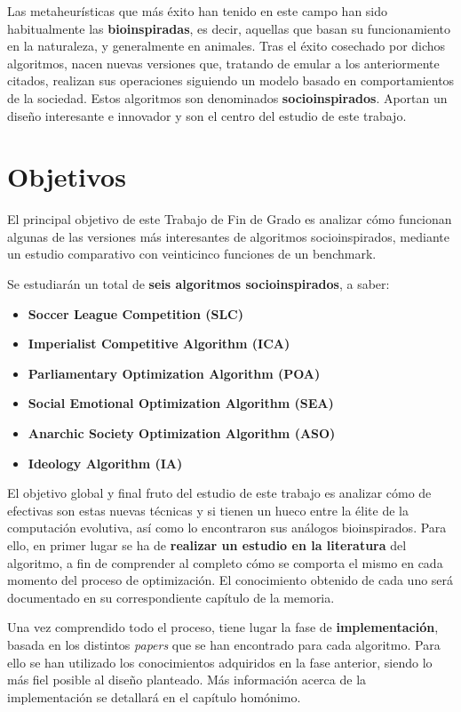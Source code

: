 Las metaheurísticas que más éxito han tenido en este campo han sido habitualmente las \textbf{bioinspiradas}, es decir, aquellas que basan su funcionamiento en la naturaleza, y generalmente en animales. Tras el éxito cosechado por dichos algoritmos, nacen nuevas versiones que, tratando de emular a los anteriormente citados, realizan sus operaciones siguiendo un modelo basado en comportamientos de la sociedad. Estos algoritmos son denominados \textbf{socioinspirados}. Aportan un diseño interesante e innovador y son el centro del estudio de este trabajo.

\section{Objetivos}

El principal objetivo de este Trabajo de Fin de Grado es analizar cómo funcionan algunas de las versiones más interesantes de algoritmos socioinspirados, mediante un estudio comparativo con veinticinco funciones de un benchmark. 

Se estudiarán un total de \textbf{seis algoritmos socioinspirados}, a saber:

\begin{itemize}
	\item \textbf{Soccer League Competition (SLC)}
	\item \textbf{Imperialist Competitive Algorithm (ICA)}
	\item \textbf{Parliamentary Optimization Algorithm (POA)}
	\item \textbf{Social Emotional Optimization Algorithm (SEA)}
	\item \textbf{Anarchic Society Optimization Algorithm (ASO)}
	\item \textbf{Ideology Algorithm (IA)}
\end{itemize}

El objetivo global y final fruto del estudio de este trabajo es analizar cómo de efectivas son estas nuevas técnicas y si tienen un hueco entre la élite de la computación evolutiva, así como lo encontraron sus análogos bioinspirados. Para ello, en primer lugar se ha de \textbf{realizar un estudio en la literatura} del algoritmo, a fin de comprender al completo cómo se comporta el mismo en cada momento del proceso de optimización. El conocimiento obtenido de cada uno será documentado en su correspondiente capítulo de la memoria.

Una vez comprendido todo el proceso, tiene lugar la fase de \textbf{implementación}, basada en los distintos \textit{papers} que se han encontrado para cada algoritmo. Para ello se han utilizado los conocimientos adquiridos en la fase anterior, siendo lo más fiel posible al diseño planteado. Más información acerca de la implementación se detallará en el capítulo homónimo.

